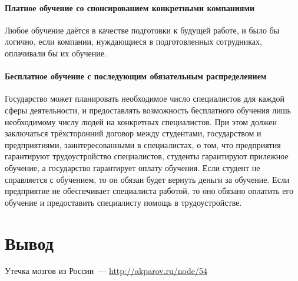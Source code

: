 \documentclass[10pt,a4paper,titlepage]{article}
\begin{document}
\paragraph{Платное обучение со спонсированием конкретными компаниями}
Любое обучение даётся в качестве подготовки к будущей работе, и было бы логично, 
если компании, нуждающиеся в подготовленных сотрудниках, оплачивали бы их обучение.

\paragraph{Бесплатное обучение с последующим обязательным распределением}
Государство может планировать необходимое число специалистов для каждой сферы деятельности, 
и предоставлять возможность бесплатного обучения лишь необходимому числу людей на конкретных специалистов.
При этом должен заключаться трёхсторонний договор между студентами, государством и предприятиями, 
заинтересованными в специалистах, о том, что предприятия гарантируют трудоустройство специалистов, 
студенты гарантируют прилежное обучение, а государство гарантирует оплату обучения.
Если студент не справляется с обучением, то он обязан будет вернуть деньги за обучение.
Если предприятие не обеспечивает специалиста работой, то оно обязано оплатить его обучение и
предоставить специалисту помощь в трудоустройстве.

\section*{Вывод}

\pagebreak
\begin{thebibliography}{99}
    Утечка мозгов из России~--- \url{http://akparov.ru/node/54}
\end{thebibliography}
\end{document}
